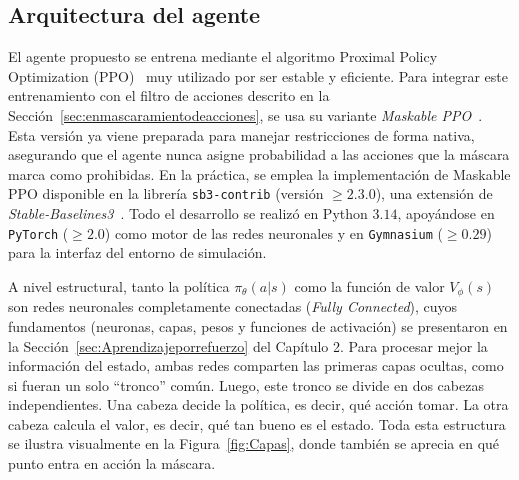 \subsection{Arquitectura del agente} \label{sec:Arquitecturadelagente}
El agente propuesto se entrena mediante el algoritmo Proximal Policy Optimization (PPO)~\cite{Schulman2017} muy utilizado por ser estable y eficiente. Para integrar este entrenamiento con el filtro de acciones descrito en la Sección~\ref{sec:enmascaramientodeacciones}, se usa su variante \textit{Maskable PPO}~\cite{HuangOntanon2020}. Esta versión ya viene preparada para manejar restricciones de forma nativa, asegurando que el agente nunca asigne probabilidad a las acciones que la máscara marca como prohibidas. En la práctica, se emplea la implementación de Maskable PPO disponible en la librería \texttt{sb3-contrib} (versión $\geq 2{.}3{.}0$), una extensión de \textit{Stable-Baselines3}~\cite{Raffin2021}. Todo el desarrollo se realizó en Python $3{.}14$, apoyándose en \texttt{PyTorch} ($\geq 2{.}0$) como motor de las redes neuronales y en \texttt{Gymnasium} ($\geq 0{.}29$) para la interfaz del entorno de simulación.


 
A nivel estructural, tanto la política $\pi_{\theta}(a|s)$ como la función de valor $V_{\phi}(s)$ son redes neuronales completamente conectadas (\textit{Fully Connected}), cuyos fundamentos (neuronas, capas, pesos y funciones de activación) se presentaron en la Sección~\ref{sec:Aprendizajeporrefuerzo} del Capítulo 2. Para procesar mejor la información del estado, ambas redes comparten las primeras capas ocultas, como si fueran un solo \enquote{tronco} común. Luego, este tronco se divide en dos cabezas independientes. Una cabeza decide la política, es decir, qué acción tomar. La otra cabeza calcula el valor, es decir, qué tan bueno es el estado. Toda esta estructura se ilustra visualmente en la Figura~\ref{fig:Capas}, donde también se aprecia en qué punto entra en acción la máscara.

